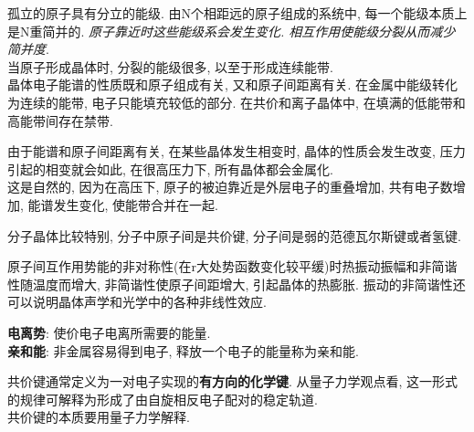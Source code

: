 \documentclass[openany]{article}
\begin{document}
孤立的原子具有分立的能级. 由N个相距远的原子组成的系统中, 每一个能级本质上是N重简并的. \emph{原子靠近时这些能级系会发生变化.  相互作用使能级分裂从而减少简并度}.\\
当原子形成晶体时, 分裂的能级很多, 以至于形成连续能带.\\
晶体电子能谱的性质既和原子组成有关, 又和原子间距离有关. 在金属中能级转化为连续的能带, 电子只能填充较低的部分. 在共价和离子晶体中, 在填满的低能带和高能带间存在禁带.

由于能谱和原子间距离有关, 在某些晶体发生相变时, 晶体的性质会发生改变, 压力引起的相变就会如此, 在很高压力下, 所有晶体都会金属化.\\
这是自然的, 因为在高压下, 原子的被迫靠近是外层电子的重叠增加, 共有电子数增加, 能谱发生变化, 使能带合并在一起.

分子晶体比较特别, 分子中原子间是共价键,
分子间是弱的范德瓦尔斯键或者氢键.

原子间互作用势能的非对称性(在r大处势函数变化较平缓)时热振动振幅和非简谐性随温度而增大,
非简谐性使原子间距增大, 引起晶体的热膨胀.
振动的非简谐性还可以说明晶体声学和光学中的各种非线性效应.

\textbf{电离势}: 使价电子电离所需要的能量.\\
\textbf{亲和能}: 非金属容易得到电子, 释放一个电子的能量称为亲和能.

共价键通常定义为一对电子实现的\textbf{有方向的化学键}. 从量子力学观点看, 这一形式的规律可解释为形成了由自旋相反电子配对的稳定轨道.\\
共价键的本质要用量子力学解释.
\end{document}
